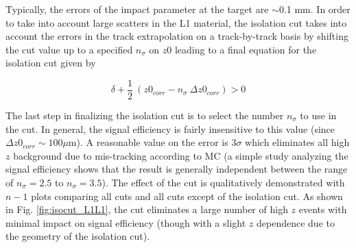 
Typically, the errors of the impact parameter at the target are $\sim$0.1 mm. In order to take into account large scatters in the L1 material, the isolation cut takes into account the errors in the track extrapolation on a track-by-track basis by shifting the cut value up to a specified $n_{\sigma}$ on $z0$ leading to a final equation for the isolation cut given by 

\begin{equation}
    \delta + \frac{1}{2} \ (z0_{corr} - n_{\sigma} \ \Delta z0_{corr})> 0
    \label{equ:iso_final_simple}
\end{equation}

The last step in finalizing the isolation cut is to select the number $n_{\sigma}$ to use in the cut. In general, the signal efficiency is fairly insensitive to this value (since $\Delta z0_{corr} \sim 100 \mu$m). %
A reasonable value on the error is $3\sigma$ which eliminates all high $z$ background due to mis-tracking according to MC (a simple study analyzing the signal efficiency shows that the result is generally independent between the range of $n_{\sigma}=2.5$ to $n_{\sigma}=3.5$). The effect of the cut is qualitatively demonstrated with $n-1$ plots comparing all cuts and all cuts except of the isolation cut. As shown in Fig. \ref{fig:isocut_L1L1}, the cut eliminates a large number of high $z$ events with minimal impact on signal efficiency (though with a slight $z$ dependence due to the geometry of the isolation cut). %

